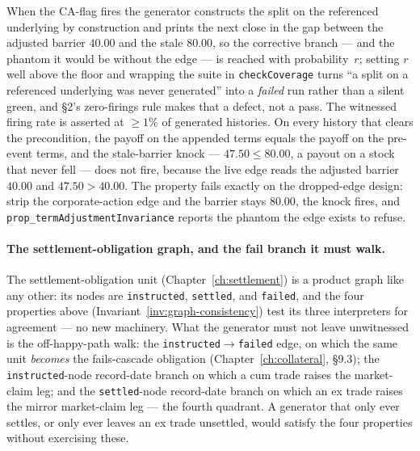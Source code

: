When the CA-flag fires the generator constructs the split on the referenced underlying by
construction and prints the next close in the gap between the adjusted barrier $40.00$ and the
stale $80.00$, so the corrective branch --- and the phantom it would be without the edge --- is
reached with probability~$r$; setting $r$ well above the floor and wrapping the suite in
\texttt{checkCoverage} turns ``a split on a referenced underlying was never generated'' into a
\emph{failed} run rather than a silent green, and \S 2's zero-firings rule makes that a defect,
not a pass. The witnessed firing rate is asserted at $\ge 1\%$ of generated histories. On every
history that clears the precondition, the payoff on the appended terms equals the payoff on the
pre-event terms, and the stale-barrier knock --- $47.50 \le 80.00$, a payout on a stock that
never fell --- does not fire, because the live edge reads the adjusted barrier $40.00$ and
$47.50 > 40.00$. The property fails exactly on the dropped-edge design: strip the
corporate-action edge and the barrier stays $80.00$, the knock fires, and
\texttt{prop\_termAdjustmentInvariance} reports the phantom the edge exists to refuse.

\paragraph{The settlement-obligation graph, and the fail branch it must walk.} The
settlement-obligation unit (Chapter~\ref{ch:settlement}) is a product graph like any
other: its nodes are \texttt{instructed}, \texttt{settled}, and \texttt{failed}, and the
four properties above (Invariant~\ref{inv:graph-consistency}) test its three interpreters
for agreement --- no new machinery. What the generator must not leave unwitnessed is the
off-happy-path walk: the \texttt{instructed}$\to$\texttt{failed} edge, on which the same
unit \emph{becomes} the fails-cascade obligation (Chapter~\ref{ch:collateral}, \S9.3); the
\texttt{instructed}-node record-date branch on which a cum trade raises the market-claim
leg; and the \texttt{settled}-node record-date branch on which an ex trade raises the
mirror market-claim leg --- the fourth quadrant. A generator that only ever settles, or
only ever leaves an ex trade unsettled, would satisfy the four properties without
exercising these.

